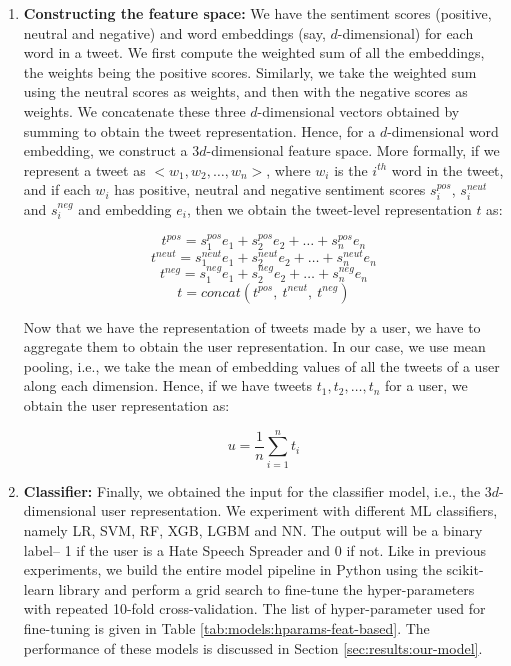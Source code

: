 \begin{enumerate}
    \item \label{enum:models:our-model:method:wght-sum} \textbf{Constructing the feature space:} We have the sentiment scores (positive, neutral and negative) and word embeddings (say, $d$-dimensional) for each word in a tweet. We first compute the weighted sum of all the embeddings, the weights being the positive scores. Similarly, we take the weighted sum using the neutral scores as weights, and then with the negative scores as weights. We concatenate these three $d$-dimensional vectors obtained by summing to obtain the tweet representation. Hence, for a $d$-dimensional word embedding, we construct a $3d$-dimensional feature space. More formally, if we represent a tweet as $<w_1, w_2, \dots, w_n>$, where $w_i$ is the $i^{th}$ word in the tweet, and if each $w_i$ has positive, neutral and negative sentiment scores $\mathit{s_i^{pos}}$, $\mathit{s_i^{neut}}$ and $\mathit{s_i^{neg}}$ and embedding $e_i$, then we obtain the tweet-level representation $t$ as:
    
    \[ t^{pos} = \mathit{s_1^{pos}}e_1 + \mathit{s_2^{pos}}e_2 + \dots + \mathit{s_n^{pos}}e_n \]
    \[ t^{neut} = \mathit{s_1^{neut}}e_1 + \mathit{s_2^{neut}}e_2 + \dots + \mathit{s_n^{neut}}e_n \]
    \[ t^{neg} = \mathit{s_1^{neg}}e_1 + \mathit{s_2^{neg}}e_2 + \dots + \mathit{s_n^{neg}}e_n \]
    \[ t = concat(t^{pos}, \ t^{neut}, \ t^{neg}) \]
    
    
    Now that we have the representation of tweets made by a user, we have to aggregate them to obtain the user representation. In our case, we use mean pooling, i.e., we take the mean of embedding values of all the tweets of a user along each dimension. Hence, if we have tweets $t_1, t_2, \dots, t_{n}$ for a user, we obtain the user representation as:
    
    \[ u = \frac{1}{n} \sum_{i=1}^{n} t_i \]
    
    \item \textbf{Classifier:} Finally, we obtained the input for the classifier model, i.e., the $3d$-dimensional user representation. We experiment with different ML classifiers, namely \ac{LR}, \ac{SVM}, \ac{RF}, \ac{XGB}, \ac{LGBM} and \ac{NN}. The output will be a binary label-- 1 if the user is a Hate Speech Spreader and 0 if not. Like in previous experiments, we build the entire model pipeline in Python using the scikit-learn library and perform a grid search to fine-tune the hyper-parameters with repeated 10-fold cross-validation. The list of hyper-parameter used for fine-tuning is given in Table \ref{tab:models:hparams-feat-based}. The performance of these models is discussed in Section \ref{sec:results:our-model}.
\end{enumerate}

